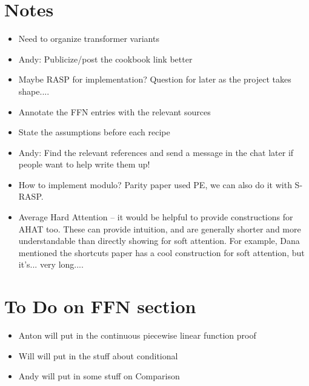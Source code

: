 \documentclass{article}
\begin{document}
\section{Notes}
\begin{itemize}
    \item Need to organize transformer variants
    \item Andy: Publicize/post the cookbook link better
    \item Maybe RASP for implementation? Question for later as the project takes shape....
    \item Annotate the FFN entries with the relevant sources
    \item State the assumptions before each recipe
    \item Andy: Find the relevant references and send a message in the chat later if people want to help write them up!
    \item How to implement modulo? Parity paper used PE, we can also do it with S-RASP.
    \item Average Hard Attention -- it would be helpful to provide constructions for AHAT too. These can provide intuition, and are generally shorter and more understandable than directly showing for soft attention. For example, Dana mentioned the shortcuts paper has a cool construction for soft attention, but it's... very long....
\end{itemize}

\section{To Do on FFN section}
\begin{itemize}
    \item Anton will put in the continuous piecewise linear function proof
    \item Will will put in the stuff about conditional
    \item Andy will put in some stuff on Comparison
\end{itemize}
\end{document}
